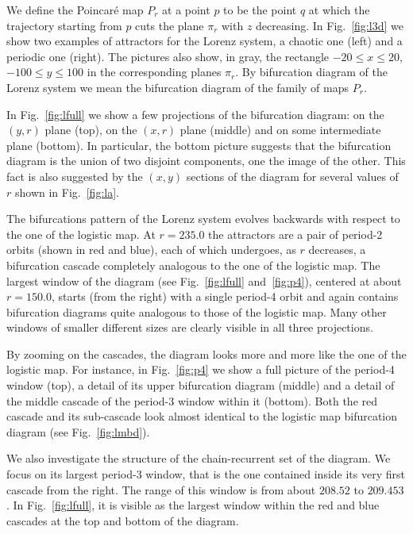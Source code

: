 \documentclass{article}
\def\rhoo{r}
\begin{document}
We define the Poincar\'e map $P_\rhoo$ at a point $p$ to be the point $q$ at which the trajectory starting from $p$ cuts the plane $\pi_\rhoo$ with $z$ decreasing. 
In Fig.~\ref{fig:l3d} we show two examples of attractors for the Lorenz system, a chaotic one (left) and a periodic one (right). 
The pictures also show, in gray, the rectangle $-20\leq x\leq20$, $-100\leq y\leq100$ in the corresponding planes $\pi_\rhoo$. 
By bifurcation diagram of the Lorenz system we mean the bifurcation diagram of the family of maps $P_\rhoo$.


In Fig.~\ref{fig:lfull} we show a few projections of the bifurcation diagram: on the $(y,\rhoo)$ plane (top), on the $(x,\rhoo)$ plane (middle) and on some intermediate plane (bottom). In particular, the bottom picture suggests that the bifurcation diagram is the union of two disjoint components, one the image of the other. This fact is also suggested by the $(x,y)$ sections of the diagram for several values of $\rhoo$ shown in Fig.~\ref{fig:la}.

The bifurcations pattern of the Lorenz system evolves backwards with respect to the one of the logistic map. 
At $\rhoo=235.0$ the attractors are a pair of period-2 orbits (shown in red and blue), each of which undergoes, as $\rhoo$ decreases, a bifurcation cascade completely analogous to the one of the logistic map. 
The largest window of the diagram (see Fig.~\ref{fig:lfull} and~\ref{fig:p4}), centered at about $\rhoo=150.0$, starts (from the right) with a single period-4 orbit and again contains bifurcation diagrams quite analogous to those of the logistic map. 
Many other windows of smaller different sizes are clearly visible in all three projections.

By zooming on the cascades, the diagram looks more and more like the one of the logistic map. For instance, in Fig.~\ref{fig:p4} we show a full picture of the period-4 window (top), a detail of its upper bifurcation diagram (middle) and a detail of the middle cascade of the period-3 window within it (bottom). Both the red cascade and its sub-cascade look almost identical to the logistic map bifurcation diagram (see Fig.~\ref{fig:lmbd}).

We also investigate the structure of the chain-recurrent set of the diagram. We focus on its largest period-3 window, that is the one contained inside its very first cascade from the right. The range of this window is from  about $208.52$ to $209.453$. In Fig.~\ref{fig:lfull}, it is visible as the largest window within the red and blue cascades at the top and bottom of the diagram. 
\end{document}
